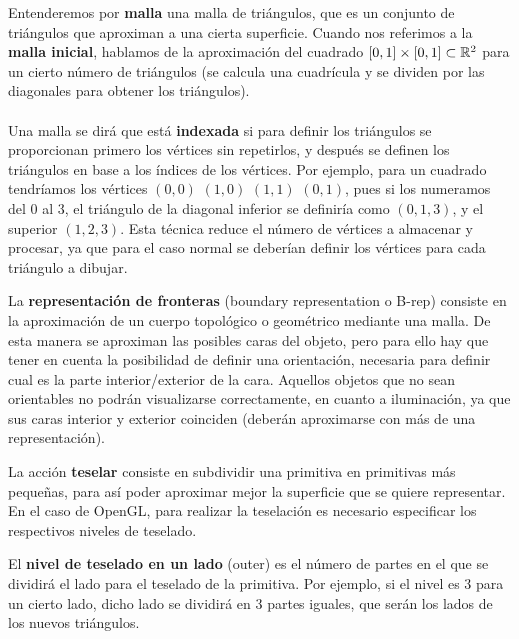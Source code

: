 \begin{definicion} Entenderemos por \textbf{malla} una malla de triángulos, que es un conjunto de triángulos que aproximan a una cierta superficie. Cuando nos referimos a la \textbf{malla inicial}, hablamos de la aproximación del cuadrado $[0,1]\times[0,1]\subset \mathbb{R}^2$ para un cierto número de triángulos (se calcula una cuadrícula y se dividen por las diagonales para obtener los triángulos).\\
\\Una malla se dirá que está \textbf{indexada} si para definir los triángulos se proporcionan primero los vértices sin repetirlos, y después se definen los triángulos en base a los índices de los vértices. Por ejemplo, para un cuadrado tendríamos los vértices $(0,0)$ $(1,0)$ $(1,1)$ $(0,1)$, pues si los numeramos del $0$ al $3$, el triángulo de la diagonal inferior se definiría como $(0,1,3)$, y el superior $(1,2,3)$. Esta técnica reduce el número de vértices a almacenar y procesar, ya que para el caso normal se deberían definir los vértices para cada triángulo a dibujar.
\end{definicion}

\begin{definicion} La \textbf{representación de fronteras} (boundary representation o B-rep) consiste en la aproximación de un cuerpo topológico o geométrico mediante una malla. De esta manera se aproximan las posibles caras del objeto, pero para ello hay que tener en cuenta la posibilidad de definir una orientación, necesaria para definir cual es la parte interior/exterior de la cara. Aquellos objetos que no sean orientables no podrán visualizarse correctamente, en cuanto a iluminación, ya que sus caras interior y exterior coinciden (deberán aproximarse con más de una representación).
\end{definicion}

\begin{definicion} La acción \textbf{teselar} consiste en subdividir una primitiva en primitivas más pequeñas, para así poder aproximar mejor la superficie que se quiere representar. En el caso de OpenGL, para realizar la teselación es necesario especificar los respectivos niveles de teselado.
\end{definicion}

\begin{definicion} El \textbf{nivel de teselado en un lado} (outer) es el número de partes en el que se dividirá el lado para el teselado de la primitiva. Por ejemplo, si el nivel es $3$ para un cierto lado, dicho lado se dividirá en $3$ partes iguales, que serán los lados de los nuevos triángulos.
\end{definicion}

